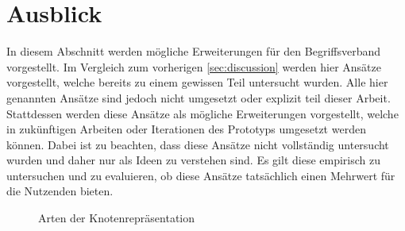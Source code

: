 \section{Ausblick}\label{sec:outlook}
In diesem Abschnitt werden mögliche Erweiterungen für den Begriffsverband vorgestellt.
Im Vergleich zum vorherigen \autoref{sec:discussion} werden hier Ansätze vorgestellt, welche bereits zu einem gewissen Teil untersucht wurden.
Alle hier genannten Ansätze sind jedoch nicht umgesetzt oder explizit teil dieser Arbeit.
Stattdessen werden diese Ansätze als mögliche Erweiterungen vorgestellt, welche in zukünftigen Arbeiten oder Iterationen des Prototyps umgesetzt werden können.
Dabei ist zu beachten, dass diese Ansätze nicht vollständig untersucht wurden und daher nur als Ideen zu verstehen sind.
Es gilt diese empirisch zu untersuchen und zu evaluieren, ob diese Ansätze tatsächlich einen Mehrwert für die Nutzenden bieten. \\

\begin{figure}[!ht]
    \centering
    \caption{\label{fig:node-types}Arten der Knotenrepräsentation}
\end{figure}


